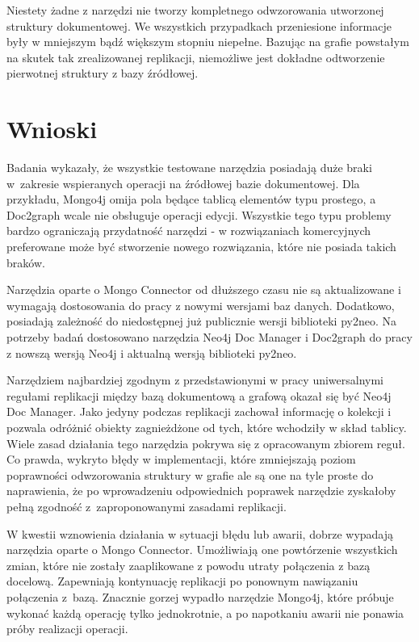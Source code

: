 \documentclass[a4paper,twoside,12pt]{book}
\begin{document}
Niestety żadne z narzędzi nie tworzy kompletnego odwzorowania utworzonej struktury dokumentowej. We wszystkich przypadkach przeniesione informacje były w mniejszym bądź większym stopniu niepełne. Bazując na grafie powstałym na skutek tak zrealizowanej replikacji, niemożliwe jest dokładne odtworzenie pierwotnej struktury z bazy źródłowej.

\section{Wnioski}

Badania wykazały, że wszystkie testowane narzędzia posiadają duże braki w~zakresie wspieranych operacji na źródłowej bazie dokumentowej. Dla przykładu, Mongo4j omija pola będące tablicą elementów typu prostego, a Doc2graph wcale nie obsługuje operacji edycji. Wszystkie tego typu problemy bardzo ograniczają przydatność narzędzi - w rozwiązaniach komercyjnych preferowane może być stworzenie nowego rozwiązania, które nie posiada takich braków.

Narzędzia oparte o Mongo Connector od dłuższego czasu nie są aktualizowane i wymagają dostosowania do pracy z nowymi wersjami baz danych. Dodatkowo, posiadają zależność do niedostępnej już publicznie wersji biblioteki py2neo. Na potrzeby badań dostosowano narzędzia Neo4j Doc Manager i Doc2graph do pracy z nowszą wersją Neo4j i aktualną wersją biblioteki py2neo. 

Narzędziem najbardziej zgodnym z przedstawionymi w pracy uniwersalnymi regułami replikacji między bazą dokumentową a grafową okazał się być Neo4j Doc Manager. Jako jedyny podczas replikacji zachował informację o kolekcji i pozwala odróżnić obiekty zagnieżdżone od tych, które wchodziły w skład tablicy. Wiele zasad działania tego narzędzia pokrywa się z opracowanym zbiorem reguł. Co prawda, wykryto błędy w implementacji, które zmniejszają poziom poprawności odwzorowania struktury w grafie ale są one na tyle proste do naprawienia, że po wprowadzeniu odpowiednich poprawek narzędzie zyskałoby pełną zgodność z~zaproponowanymi zasadami replikacji.

W kwestii wznowienia działania w sytuacji błędu lub awarii, dobrze wypadają narzędzia oparte o Mongo Connector. Umożliwiają one powtórzenie wszystkich zmian, które nie zostały zaaplikowane z powodu utraty połączenia z bazą docelową. Zapewniają kontynuację replikacji po ponownym nawiązaniu połączenia z~bazą. Znacznie gorzej wypadło narzędzie Mongo4j, które próbuje wykonać każdą operację tylko jednokrotnie, a po napotkaniu awarii nie ponawia próby realizacji operacji.
\end{document}
